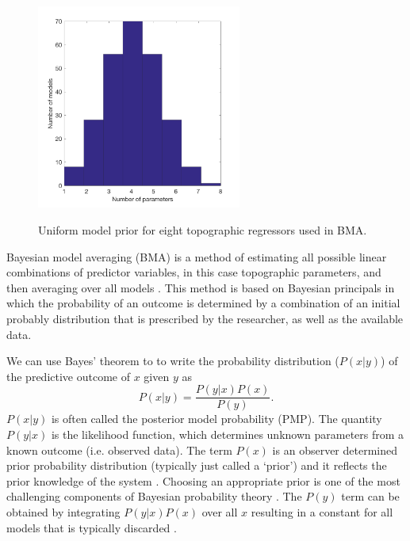 \documentclass{sfuthesis}
\begin{document}
\begin{figure}
	\centering
	\includegraphics[width = 0.6\textwidth]{DistributionOfNumParams_topoRegress.png}\\
	\caption{Uniform model prior for eight topographic regressors used in BMA.}
	\label{fig:uni_model_prior}
\end{figure}

Bayesian model averaging (BMA) is a method of estimating all possible linear combinations of predictor variables, in this case topographic parameters, and then averaging over all models \citep[e.g.][]{Raftery1997, Wasserman2000, Raftery2005}.  This method is based on Bayesian principals in which the probability of an outcome is determined by a combination of an initial probably distribution that is prescribed by the researcher, as well as the available data. 

We can use Bayes' theorem to to write the probability distribution ($P(x|y)$) of the predictive outcome of $x$ given $y$ as
\begin{equation}
P(x|y) = \frac{P(y|x)P(x)}{P(y)}.
\end{equation}
$P(x|y)$ is often called the posterior model probability (PMP). The quantity $P(y|x)$ is the likelihood function, which determines unknown parameters from a known outcome (i.e. observed data). The term $P(x)$ is an observer determined prior probability distribution (typically just called a `prior') and it reflects the prior knowledge of the system \citep{Raftery1997}. Choosing an appropriate prior is one of the most challenging components of Bayesian probability theory \citep{Wasserman2000}. The $P(y)$ term can be obtained by integrating $P(y|x)P(x)$ over all $x$ resulting in a constant for all models that is typically discarded \citep{Wasserman2000}. 
\end{document}
